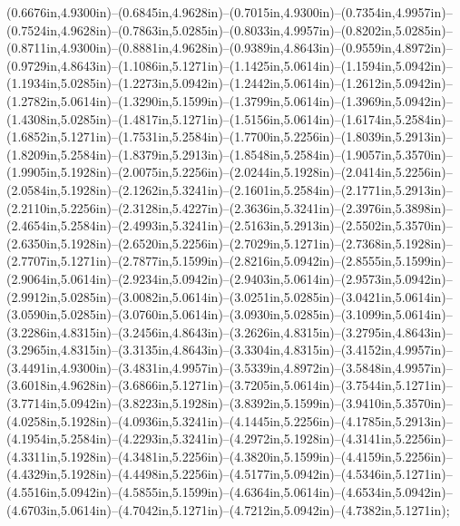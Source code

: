 (0.6676in,4.9300in)--(0.6845in,4.9628in)--(0.7015in,4.9300in)--(0.7354in,4.9957in)--(0.7524in,4.9628in)--(0.7863in,5.0285in)--(0.8033in,4.9957in)--(0.8202in,5.0285in)--(0.8711in,4.9300in)--(0.8881in,4.9628in)--(0.9389in,4.8643in)--(0.9559in,4.8972in)--(0.9729in,4.8643in)--(1.1086in,5.1271in)--(1.1425in,5.0614in)--(1.1594in,5.0942in)--(1.1934in,5.0285in)--(1.2273in,5.0942in)--(1.2442in,5.0614in)--(1.2612in,5.0942in)--(1.2782in,5.0614in)--(1.3290in,5.1599in)--(1.3799in,5.0614in)--(1.3969in,5.0942in)--(1.4308in,5.0285in)--(1.4817in,5.1271in)--(1.5156in,5.0614in)--(1.6174in,5.2584in)--(1.6852in,5.1271in)--(1.7531in,5.2584in)--(1.7700in,5.2256in)--(1.8039in,5.2913in)--(1.8209in,5.2584in)--(1.8379in,5.2913in)--(1.8548in,5.2584in)--(1.9057in,5.3570in)--(1.9905in,5.1928in)--(2.0075in,5.2256in)--(2.0244in,5.1928in)--(2.0414in,5.2256in)--(2.0584in,5.1928in)--(2.1262in,5.3241in)--(2.1601in,5.2584in)--(2.1771in,5.2913in)--(2.2110in,5.2256in)--(2.3128in,5.4227in)--(2.3636in,5.3241in)--(2.3976in,5.3898in)--(2.4654in,5.2584in)--(2.4993in,5.3241in)--(2.5163in,5.2913in)--(2.5502in,5.3570in)--(2.6350in,5.1928in)--(2.6520in,5.2256in)--(2.7029in,5.1271in)--(2.7368in,5.1928in)--(2.7707in,5.1271in)--(2.7877in,5.1599in)--(2.8216in,5.0942in)--(2.8555in,5.1599in)--(2.9064in,5.0614in)--(2.9234in,5.0942in)--(2.9403in,5.0614in)--(2.9573in,5.0942in)--(2.9912in,5.0285in)--(3.0082in,5.0614in)--(3.0251in,5.0285in)--(3.0421in,5.0614in)--(3.0590in,5.0285in)--(3.0760in,5.0614in)--(3.0930in,5.0285in)--(3.1099in,5.0614in)--(3.2286in,4.8315in)--(3.2456in,4.8643in)--(3.2626in,4.8315in)--(3.2795in,4.8643in)--(3.2965in,4.8315in)--(3.3135in,4.8643in)--(3.3304in,4.8315in)--(3.4152in,4.9957in)--(3.4491in,4.9300in)--(3.4831in,4.9957in)--(3.5339in,4.8972in)--(3.5848in,4.9957in)--(3.6018in,4.9628in)--(3.6866in,5.1271in)--(3.7205in,5.0614in)--(3.7544in,5.1271in)--(3.7714in,5.0942in)--(3.8223in,5.1928in)--(3.8392in,5.1599in)--(3.9410in,5.3570in)--(4.0258in,5.1928in)--(4.0936in,5.3241in)--(4.1445in,5.2256in)--(4.1785in,5.2913in)--(4.1954in,5.2584in)--(4.2293in,5.3241in)--(4.2972in,5.1928in)--(4.3141in,5.2256in)--(4.3311in,5.1928in)--(4.3481in,5.2256in)--(4.3820in,5.1599in)--(4.4159in,5.2256in)--(4.4329in,5.1928in)--(4.4498in,5.2256in)--(4.5177in,5.0942in)--(4.5346in,5.1271in)--(4.5516in,5.0942in)--(4.5855in,5.1599in)--(4.6364in,5.0614in)--(4.6534in,5.0942in)--(4.6703in,5.0614in)--(4.7042in,5.1271in)--(4.7212in,5.0942in)--(4.7382in,5.1271in);

